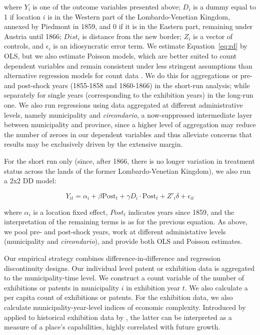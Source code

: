 \noindent where $ Y_{i} $ is one of the outcome variables presented above; $ D_i $ is a dummy equal to 1 if location $ i $ is in the Western part of the Lombardo-Venetian Kingdom, annexed by Piedmont in 1859, and 0 if it is in the Eastern part, remaining under Austria until 1866; $ Dist_i $ is distance from the new border; $Z_{i}$ is a vector of controls, and $\epsilon_{i}$ is an idiosyncratic error term. 
We estimate Equation~\ref{eq:rd} by OLS, but we also estimate Poisson models, which are better suited to count dependent variables and remain consistent under less stringent assumptions than alternative regression models for count data \citep{cohn2022count}. 
We do this for aggregations or pre- and post-shock years (1855-1858 and 1860-1866) in the short-run analysis; while separately for single years (corresponding to the exhibition years) in the long-run one. 
We also run regressions using data aggregated at different administrative levels, namely municipality and \textit{circondario}, a now-suppressed intermediate layer between municipality and province, since a higher level of aggregation may reduce the number of zeroes in our dependent variables and thus alleviate concerns that results may be exclusively driven by the extensive margin.    

\iffalse
For the short run only (since, after 1866, there is no longer variation in treatment status across the lands of the former Lombardo-Venetian Kingdom), we also run a 2x2 DD model:

\begin{equation}\label{eq:twfe_2x2}
    Y_{it} = \alpha_i + \beta \text{Post}_t + \gamma D_i \cdot \text{Post}_t + Z'_{i} \delta + \epsilon_{it}
\end{equation}

\noindent where $ \alpha_i$ is a location fixed effect, $ Post_t $ indicates years since 1859, and the interpretation of the remaining terms is as for the previous equation. 
As above, we pool pre- and post-shock years, work at different administative levels (municipality and \textit{circondario}), and provide both OLS and Poisson estimates. 

Our empirical strategy combines difference-in-difference and regression discontinuity designs. Our individual level patent or exhibition data is aggregated to the municipality-time level. We construct a count variable of the number of exhibitions or patents in municipality $i$ in exhibition year $t$. We also calculate a per capita count of exhibitions or patents. For the exhibition data, we also calculate municipality-year-level indices of economic complexity. Introduced by \cite{hidalgo2009} applied to historical exhibition data by \citet{domini2022}, the latter can be interpreted as a measure of a place's capabilities, highly correlated with future growth. 

